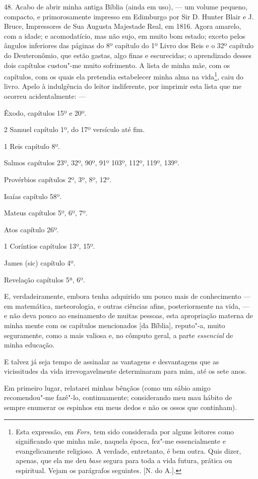 48. Acabo de abrir minha antiga Bíblia (ainda em uso), --- um volume
pequeno, compacto, e primorosamente impresso em Edimburgo por Sir D.
Hunter Blair e J. Bruce, Impressores de Sua Augusta Majestade Real, em
1816. Agora amarelo, com a idade; e acomodatício, mas não sujo, em muito
bom estado; exceto pelos ângulos inferiores das páginas do 8º capítulo
do 1º Livro dos Reis e o 32º capítulo do Deuteronômio, que estão gastas,
algo finas e escurecidas; o aprendizado desses dois capítulos custou"-me
muito sofrimento. A lista de minha mãe, com os capítulos, com os quais
ela pretendia estabelecer minha alma na vida\footnote{Esta expressão, em
  \emph{Fors,} tem sido considerada por alguns leitores como
  significando que minha mãe, naquela época, fez"-me essencialmente e
  evangelicamente religioso. A verdade, entretanto, é bem outra. Quis
  dizer, apenas, que ela me deu \emph{base} segura para toda a vida
  futura, prática ou espiritual. Vejam os parágrafos seguintes. {[}N. do
  A.{]}.}, caiu do livro. Apelo à indulgência do leitor indiferente, por
imprimir esta lista que me ocorreu acidentalmente: ---

Êxodo, capítulos 15º e 20º.

2 Samuel capítulo 1º, do 17º versículo até fim.

1 Reis capítulo 8º.

Salmos capítulos 23º, 32º, 90º, 91º 103º, 112º, 119º, 139º.

Provérbios capítulos 2º, 3º, 8º, 12º.

Isaías capítulo 58º.

Mateus capítulos 5º, 6º, 7º.

Atos capítulo 26º.

1 Coríntios capítulos 13º, 15º.

James (sic) capítulo 4º.

Revelação capítulos 5ª, 6º.

E, verdadeiramente, embora tenha adquirido um pouco mais de conhecimento
--- em matemática, meteorologia, e outras ciências afins, posteriormente
na vida, --- e não deva pouco ao ensinamento de muitas pessoas, esta
apropriação materna de minha mente com os capítulos mencionados {[}da
Bíblia{]}, reputo"-a, muito seguramente, como a mais valiosa e, no
cômputo geral, a parte \emph{essencial} de minha educação.

E talvez já seja tempo de assinalar as vantagens e desvantagens que as
vicissitudes da vida irrevogavelmente determinaram para mim, até os sete
anos.

Em primeiro lugar, relatarei minhas bênçãos (como um sábio amigo
recomendou"-me fazê"-lo, continuamente; considerando meu mau hábito de
sempre enumerar os espinhos em meus dedos e não os ossos que continham).

